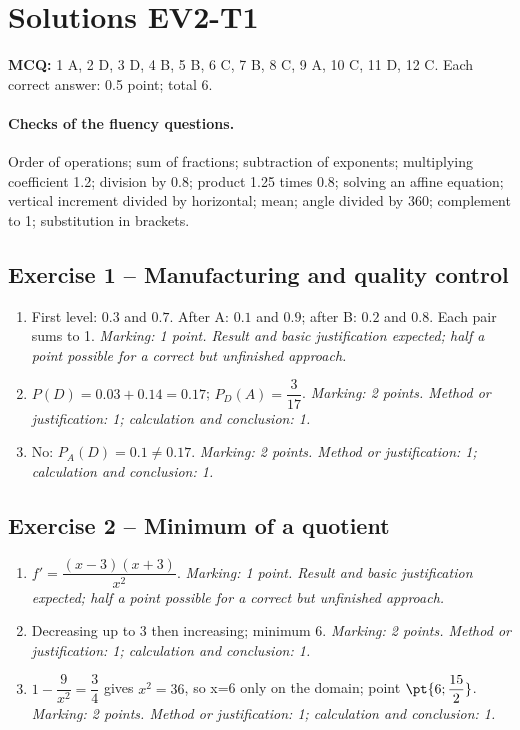 \mxnewpage\section*{Solutions EV2-T1}\label{EV2-T1-CORR}
\textbf{MCQ:} 1 A, 2 D, 3 D, 4 B, 5 B, 6 C, 7 B, 8 C, 9 A, 10 C, 11 D, 12 C. Each correct answer: \num{0,5} point; total 6.
\paragraph{Checks of the fluency questions.} Order of operations; sum of fractions; subtraction of exponents; multiplying coefficient \num{1,2}; division by \num{0,8}; product \num{1,25} times \num{0,8}; solving an affine equation; vertical increment divided by horizontal; mean; angle divided by 360; complement to 1; substitution in brackets.
\subsection*{Exercise 1 -- Manufacturing and quality control}
\begin{enumerate}
\item First level: $\num{0,3}$ and $\num{0,7}$. After A: $\num{0,1}$ and $\num{0,9}$; after B: $\num{0,2}$ and $\num{0,8}$. Each pair sums to 1. \textit{Marking: 1 point. Result and basic justification expected; half a point possible for a correct but unfinished approach.}
\item $P(D)=\num{0,03}+\num{0,14}=\num{0,17}$; $P_D(A)=\dfrac{3}{17}$. \textit{Marking: 2 points. Method or justification: 1; calculation and conclusion: 1.}
\item No: $P_A(D)=\num{0,1}\ne\num{0,17}$. \textit{Marking: 2 points. Method or justification: 1; calculation and conclusion: 1.}
\end{enumerate}
\subsection*{Exercise 2 -- Minimum of a quotient}
\begin{enumerate}
\item $f\prime =\dfrac{(x-3)(x+3)}{x^2}$. \textit{Marking: 1 point. Result and basic justification expected; half a point possible for a correct but unfinished approach.}
\item Decreasing up to 3 then increasing; minimum 6. \textit{Marking: 2 points. Method or justification: 1; calculation and conclusion: 1.}
\item $1-\dfrac{9}{x^2}=\dfrac{3}{4}$ gives $x^2=36$, so x=6 only on the domain; point $\pt{6;\dfrac{15}{2}}$. \textit{Marking: 2 points. Method or justification: 1; calculation and conclusion: 1.}
\end{enumerate}
